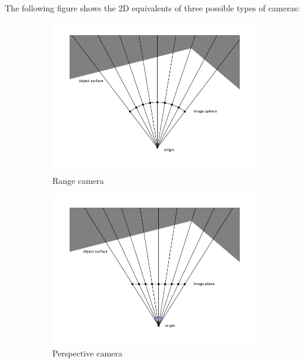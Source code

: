 The following figure shows the 2D equivalents of three possible types of cameras:
\begin{figure}[H]
\begin{subfigure}{.33\textwidth}
	\includegraphics[trim=8mm 1cm 8mm 1cm, crop, width=\linewidth]{fig/cam_range.pdf}
	\caption{Range camera}
\end{subfigure}%
\begin{subfigure}{.33\textwidth}
	\includegraphics[trim=8mm 1cm 8mm 1cm, crop, width=\linewidth]{fig/cam_perspective.pdf}
	\caption{Perspective camera}
\end{subfigure}%
\begin{subfigure}{.33\textwidth}

\end{subfigure}
\end{figure}
